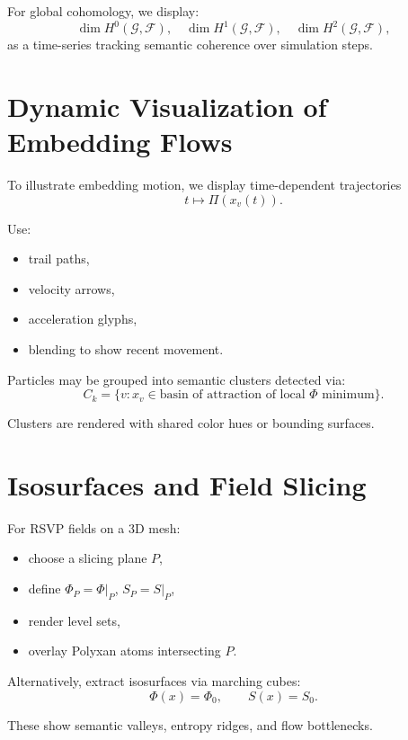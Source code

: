 For global cohomology,
we display:
\[
  \dim H^0(\mathcal{G},\mathcal{F}),\quad
  \dim H^1(\mathcal{G},\mathcal{F}),\quad
  \dim H^2(\mathcal{G},\mathcal{F}),
\]
as a time-series
tracking semantic coherence over simulation steps.


\section{Dynamic Visualization of Embedding Flows}

To illustrate embedding motion,
we display time-dependent trajectories
\[
  t \mapsto \Pi(x_v(t)).
\]

Use:
\begin{itemize}
\item trail paths,
\item velocity arrows,
\item acceleration glyphs,
\item blending to show recent movement.
\end{itemize}

Particles may be grouped into semantic clusters detected via:
\[
  C_k = \{v : x_v \in \text{basin of attraction of local }\Phi\text{ minimum}\}.
\]

Clusters are rendered with shared color hues or bounding surfaces.


\section{Isosurfaces and Field Slicing}

For RSVP fields on a 3D mesh:

\begin{itemize}
\item choose a slicing plane $P$,
\item define $\Phi_P = \Phi|_P$, $S_P = S|_P$,
\item render level sets,
\item overlay Polyxan atoms intersecting $P$.
\end{itemize}

Alternatively, extract isosurfaces via marching cubes:
\[
  \Phi(x)=\Phi_0, \qquad S(x)=S_0.
\]

These show semantic valleys, entropy ridges, and flow bottlenecks.


